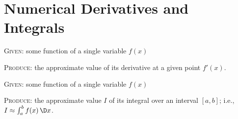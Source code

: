 \chapter{Numerical Derivatives and Integrals}


\begin{problem}
  \textsc{Given:} some function of a single variable $f(x)$

  \textsc{Produce:} the approximate value of its derivative at a given
  point $f'(x)$.
\end{problem}

\begin{problem}[Quadrature]
  \textsc{Given:} some function of a single variable $f(x)$

  \textsc{Produce:} the approximate value $I$ of its integral over an
  interval $[a,b]$; i.e., $I\approx\int^{b}_{a}f(x)\,\D x$.
\end{problem}



